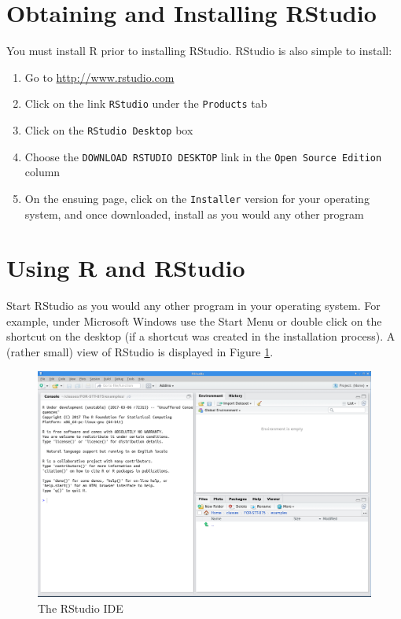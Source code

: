 \documentclass[
]{krantz}
\providecommand{\tightlist}{%
  \setlength{\itemsep}{0pt}\setlength{\parskip}{0pt}}
\begin{document}
\hypertarget{obtaining-and-installing-rstudio}{%
\section{Obtaining and Installing RStudio}\label{obtaining-and-installing-rstudio}}

You must install R prior to installing RStudio. RStudio is also simple to install:

\begin{enumerate}
\def\labelenumi{\arabic{enumi}.}
\tightlist
\item
  Go to \url{http://www.rstudio.com}
\item
  Click on the link \texttt{RStudio} under the \texttt{Products} tab
\item
  Click on the \texttt{RStudio\ Desktop} box
\item
  Choose the \texttt{DOWNLOAD\ RSTUDIO\ DESKTOP} link in the \texttt{Open\ Source\ Edition} column
\item
  On the ensuing page, click on the \texttt{Installer} version for your operating system, and once downloaded, install as you would any other program
\end{enumerate}

\hypertarget{using-r-and-rstudio}{%
\section{Using R and RStudio}\label{using-r-and-rstudio}}

Start RStudio as you would any other program in your operating system. For example, under Microsoft Windows use the Start Menu or double click on the shortcut on the desktop (if a shortcut was created in the installation process). A (rather small) view of RStudio is displayed in Figure \ref{fig:rstudioPic}.

\begin{figure}
\includegraphics[width=1\linewidth]{../figures/RStudio} \caption{The RStudio IDE}\label{fig:rstudioPic}
\end{figure}
\end{document}
